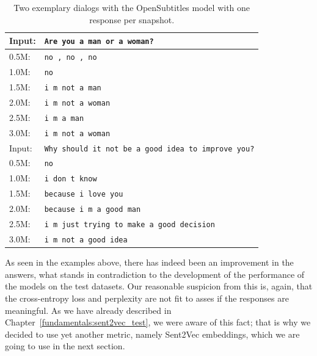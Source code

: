 \begin{table}[H]
	\centering
	\begin{adjustbox}{max width=\textwidth}
		\begin{tabular}{ll}
			\toprule
			Input: 	& \texttt{Are you a man or a woman?}\\
			\midrule
			0.5M: 	& \texttt{no , no , no}\\
			1.0M: 	& \texttt{no}\\
			1.5M:	& \texttt{i m not a man}\\
			2.0M:	& \texttt{i m not a woman}\\
			2.5M:	& \texttt{i m a man}\\
			3.0M:	& \texttt{i m not a woman}\\
			\midrule
			Input: 	& \texttt{Why should it not be a good idea to improve you?}\\
			\midrule
			0.5M: 	& \texttt{no}\\
			1.0M: 	& \texttt{i don t know}\\
			1.5M:	& \texttt{because i love you}\\
			2.0M:	& \texttt{because i m a good man}\\
			2.5M:	& \texttt{i m just trying to make a good decision}\\
			3.0M:	& \texttt{i m not a good idea}\\
			\bottomrule
		\end{tabular}
	\end{adjustbox}
	\caption{Two exemplary dialogs with the OpenSubtitles model with one response per snapshot.}
	\label{results:example_output:opensubtitles}
\end{table}

As seen in the examples above, there has indeed been an improvement in the answers, what stands in contradiction to the development of the performance of the models on the test datasets. Our reasonable suspicion from this is, again, that the cross-entropy loss and perplexity are not fit to asses if the responses are meaningful. As we have already described in Chapter~\ref{fundamentals:sent2vec_test}, we were aware of this fact; that is why we decided to use yet another metric, namely Sent2Vec embeddings, which we are going to use in the next section.

